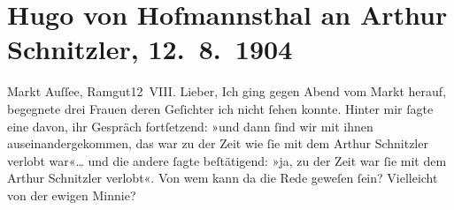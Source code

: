 

         
         \newcommand{\erwaehntePersonen}{Personen: Hermine von Schaffgotsch, Franziska Schlesinger, Louise Schnitzler, Christopher St. John, Robert Gilbert Vansittart}
         \newcommand{\erwaehnteInstitutionen}{Institutionen: Eton College}
         \newcommand{\erwaehnteOrte}{Orte: Bad Aussee, Bad Ischl, Botschaft von Großbritannien in Paris, England, Ramgut, Villa Franckenstein, Wien, Wolfgangsee}
         \newcommand{\erwaehnteWerke}{Werke: Anatol, Das Vermächtnis. Schauspiel in drei Akten, Der Schleier der Beatrice. Schauspiel in fünf Akten, Sterben. Novelle}
               \section[Hugo von Hofmannsthal an Arthur Schnitzler, 12. 8. 1904]{ Hugo von Hofmannsthal an Arthur Schnitzler, 12. 8. 1904}\nopagebreak{}\rehead{ }\begin{ledgroupsized}[t]{13cm}\normalsize\beginnumbering \toendnotes[C]{\smallbreak\pagebreak[2]} 
\toendnotes[C]{\smallbreak}\pstart
           \raggedleft{}{\pb}Markt Auſſee, Ramgut12 VIII.\pend
           \pstart{}Lieber,\pend\pstart
           Ich ging gegen Abend vom Markt herauf, begegnete
               drei Frauen deren Geſichter ich nicht ſehen konnte. Hinter mir ſagte eine davon, ihr
               Gespräch fortſetzend: »und dann ſind wir mit ihnen auseinandergekommen, das war zu
               der Zeit wie ſie mit dem Arthur Schnitzler verlobt war«{\dots}
               und die andere ſagte beſtätigend: »ja, zu der Zeit war ſie mit {\pb}dem Arthur Schnitzler verlobt«.
               Von wem kann da die Rede geweſen ſein? Vielleicht von der ewigen Minnie?\pend

\end{ledgroupsized}
